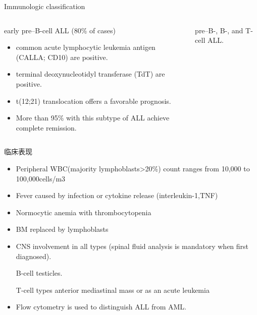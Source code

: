 \documentclass[
  ignorenonframetext,
]{beamer}
\begin{document}
\begin{frame}
\begin{block}{Immunologic classification}
\protect\hypertarget{immunologic-classification}{}
\end{block}

\begin{columns}[T]
\begin{column}{0.5\textwidth}
\begin{block}{early pre--B-cell ALL (80\% of cases)}
\protect\hypertarget{early-preb-cell-all-80-of-cases}{}
\begin{itemize}
\item
  common acute lymphocytic leukemia antigen (CALLA; CD10) are positive.
\item
  terminal deoxynucleotidyl transferase (TdT) are positive.
\item
  t(12;21) translocation offers a favorable prognosis.
\item
  More than 95\% with this subtype of ALL achieve complete remission.
\end{itemize}
\end{block}
\end{column}

\begin{column}{0.5\textwidth}
\begin{block}{pre--B-, B-, and T-cell ALL.}
\protect\hypertarget{preb--b--and-t-cell-all.}{}
\end{block}
\end{column}
\end{columns}
\end{frame}

\begin{frame}
\begin{block}{临床表现}
\protect\hypertarget{ux4e34ux5e8aux8868ux73b0-6}{}
\begin{itemize}
\item
  Peripheral WBC(majority lymphoblasts\textgreater20\%) count ranges
  from 10,000 to 100,000cells/m3
\item
  Fever caused by infection or cytokine release (interleukin-1,TNF)
\item
  Normocytic anemia with thrombocytopenia
\item
  BM replaced by lymphoblasts
\item
  CNS involvement in all types (spinal fluid analysis is mandatory when
  first diagnosed).

  B-cell testicles.

  T-cell types anterior mediastinal mass or as an acute leukemia
\item
  Flow cytometry is used to distinguish ALL from AML.
\end{itemize}
\end{block}
\end{frame}
\end{document}
